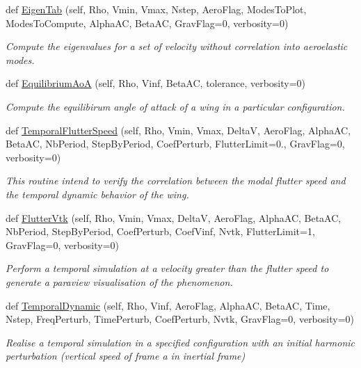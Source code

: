 \begin{DoxyCompactItemize}
def \hyperlink{classgebtaero_1_1_simulation_1_1_simulation_a2907ad4a52664321ef36ca2d05a5ea64}{Eigen\+Tab} (self, Rho, Vmin, Vmax, Nstep, Aero\+Flag, Modes\+To\+Plot, Modes\+To\+Compute, Alpha\+AC, Beta\+AC, Grav\+Flag=0, verbosity=0)
\begin{DoxyCompactList}\small\item\em Compute the eigenvalues for a set of velocity without correlation into aeroelastic modes. \end{DoxyCompactList}\item 
def \hyperlink{classgebtaero_1_1_simulation_1_1_simulation_a36a121ab1505362902de50041d6c2e5d}{Equilibrium\+AoA} (self, Rho, Vinf, Beta\+AC, tolerance, verbosity=0)
\begin{DoxyCompactList}\small\item\em Compute the equilibirum angle of attack of a wing in a particular configuration. \end{DoxyCompactList}\item 
def \hyperlink{classgebtaero_1_1_simulation_1_1_simulation_ac20465bedf1f645c1ac6fab9c45b0802}{Temporal\+Flutter\+Speed} (self, Rho, Vmin, Vmax, DeltaV, Aero\+Flag, Alpha\+AC, Beta\+AC, Nb\+Period, Step\+By\+Period, Coef\+Perturb, Flutter\+Limit=0., Grav\+Flag=0, verbosity=0)
\begin{DoxyCompactList}\small\item\em This routine intend to verify the correlation between the modal flutter speed and the temporal dynamic behavior of the wing. \end{DoxyCompactList}\item 
def \hyperlink{classgebtaero_1_1_simulation_1_1_simulation_a5c1dd2c7a88c06a76d854aa7ee1830ad}{Flutter\+Vtk} (self, Rho, Vmin, Vmax, DeltaV, Aero\+Flag, Alpha\+AC, Beta\+AC, Nb\+Period, Step\+By\+Period, Coef\+Perturb, Coef\+Vinf, Nvtk, Flutter\+Limit=1, Grav\+Flag=0, verbosity=0)
\begin{DoxyCompactList}\small\item\em Perform a temporal simulation at a velocity greater than the flutter speed to generate a paraview visualisation of the phenomenon. \end{DoxyCompactList}\item 
def \hyperlink{classgebtaero_1_1_simulation_1_1_simulation_abcfba8fd89bc92734326085c272134ae}{Temporal\+Dynamic} (self, Rho, Vinf, Aero\+Flag, Alpha\+AC, Beta\+AC, Time, Nstep, Freq\+Perturb, Time\+Perturb, Coef\+Perturb, Nvtk, Grav\+Flag=0, verbosity=0)
\begin{DoxyCompactList}\small\item\em Realise a temporal simulation in a specified configuration with an initial harmonic perturbation (vertical speed of frame a in inertial frame) \end{DoxyCompactList}\item 

\end{DoxyCompactItemize}
